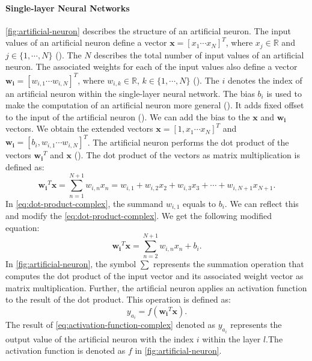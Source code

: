 \documentclass{BachelorBUI}
\begin{document}
            \paragraph{Single-layer Neural Networks}
            \label{par:single-layer-neural-networks}
                \autoref{fig:artificial-neuron} describes the structure of an artificial neuron. The input values of an artificial neuron define a vector $\mathbf{x} = [x_1 \cdots x_N]^T$, where $x_j \in \mathbb{R}$ and $j \in \{1, \cdots, N\}$ (\cite{Alpaydin:2014}). The $N$ describes the total number of input values of an artificial neuron. The associated weights for each of the input values also define a vector $\mathbf{w_i} = [w_{i,1} \cdots w_{i,N}]^T$, where $w_{i,k} \in \mathbb{R}$, $k \in \{1, \cdots, N\}$ (\cite{Alpaydin:2014}). The $i$ denotes the index of an artificial neuron within the single-layer neural network. The bias $b_i$ is used to make the computation of an artificial neuron more general (\cite{Alpaydin:2014}). It adds fixed offset to the input of the artificial neuron (\cite{Bishop:2024}). We can add the bias to the $\mathbf{x}$ and $\mathbf{w_i}$ vectors. We obtain the extended vectors $\mathbf{x} = [1, x_1 \cdots x_N]^T$ and $\mathbf{w_i} = [b_i, w_{i,1} \cdots w_{i,N}]^T$. The artificial neuron performs the dot product of the vectors $\mathbf{w_i}^T$ and $\mathbf{x}$ (\cite{Alpaydin:2014}). The dot product of the vectors as matrix multiplication is defined as:
                \begin{equation}
                    \mathbf{w_i}^T\mathbf{x} = \sum_{n=1}^{N+1} w_{i,n} x_n = w_{i,1} + w_{i,2}x_2 + w_{i,3}x_3 + \cdots + w_{i,N+1} x_{N+1}.
                    \label{eq:dot-product-complex}
                \end{equation} 
                In \autoref{eq:dot-product-complex}, the summand $w_{i,1}$ equals to $b_i$. We can reflect this and modify the \autoref{eq:dot-product-complex}. We get the following modified equation:
                \begin{equation}
                    \mathbf{w_i}^T\mathbf{x} = \sum_{n=2}^{N+1} w_{i,n} x_n + b_i.
                    \label{eq:dot-product-complex-modified}
                \end{equation} 
                In \autoref{fig:artificial-neuron}, the symbol $\sum$ represents the summation operation that computes the dot product of the input vector and its associated weight vector as matrix multiplication. Further, the artificial neuron applies an activation function to the result of the dot product. This operation is defined as:
                \begin{equation} 
                    y_{a_{i}} = f(\mathbf{w_i}^T\mathbf{x}).
                    \label{eq:activation-function-complex}
                \end{equation}
                The result of \autoref{eq:activation-function-complex} denoted as $y_{a_{i}}$ represents the output value of the artificial neuron with the index $i$ within the layer $l$.The activation function is denoted as $f$ in \autoref{fig:artificial-neuron}.
\end{document}
